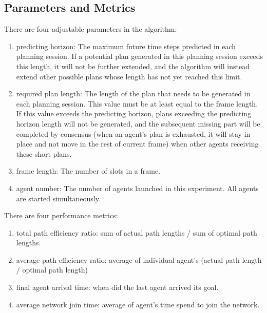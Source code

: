 \subsection*{Parameters and Metrics}
There are four adjustable parameters in the algorithm: 
\begin{enumerate}
    \item predicting horizon: The maximum future time steps predicted in each planning session. If a potential plan generated in this planning session exceeds this length, it will not be further extended, and the algorithm will instead extend other possible plans whose length has not yet reached this limit.
    \item required plan length: The length of the plan that needs to be generated in each planning session. This value must be at least equal to the frame length. If this value exceeds the predicting horizon, plans exceeding the predicting horizon length will not be generated, and the subsequent missing part will be completed by consensus (when an agent's plan is exhausted, it will stay in place and not move in the rest of current frame) when other agents receiving these short plans.
    \item frame length: The number of slots in a frame.
    \item agent number: The number of agents launched in this experiment. All agents are started simultaneously.
\end{enumerate}

There are four performance metrics:
\begin{enumerate}
    \item total path efficiency ratio: sum of actual path lengths / sum of optimal path lengths.
    \item average path efficiency ratio: average of individual agent's (actual path length / optimal path length)
    \item final agent arrival time: when did the last agent arrived its goal.
    \item average network join time: average of agent's time spend to join the network.
\end{enumerate}

